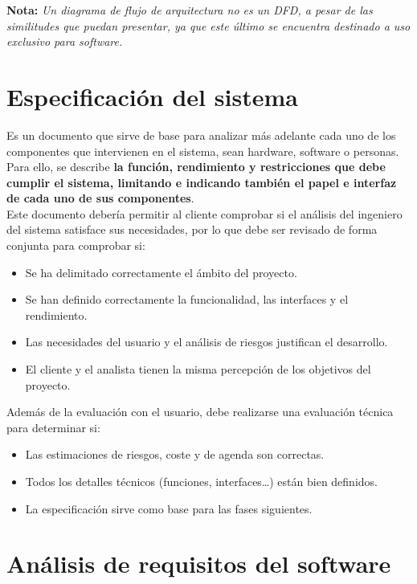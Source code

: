 \textbf{Nota:} \textit{Un diagrama de flujo de arquitectura no es un DFD, a pesar de las similitudes que puedan presentar, ya que este último se encuentra destinado a uso exclusivo para software.}

\section{Especificación del sistema}

Es un documento que sirve de base para analizar más adelante cada uno de los componentes que intervienen en el sistema, sean hardware, software o personas. Para ello, se describe \textbf{la función, rendimiento y restricciones que debe cumplir el sistema, limitando e indicando también el papel e interfaz de cada uno de sus componentes}.\\

Este documento debería permitir al cliente comprobar si el análisis del ingeniero del sistema satisface sus necesidades, por lo que debe ser revisado de forma conjunta para comprobar si:

\begin{itemize}
    \item Se ha delimitado correctamente el ámbito del proyecto.
    \item Se han definido correctamente la funcionalidad, las interfaces y el rendimiento.
    \item Las necesidades del usuario y el análisis de riesgos justifican el desarrollo.
    \item El cliente y el analista tienen la misma percepción de los objetivos del proyecto.
\end{itemize}

Además de la evaluación con el usuario, debe realizarse una evaluación técnica para determinar si:

\begin{itemize}
    \item Las estimaciones de riesgos, coste y de agenda son correctas.
    \item Todos los detalles técnicos (funciones, interfaces\ldots) están bien definidos.
    \item La especificación sirve como base para las fases siguientes.
\end{itemize}

\section{Análisis de requisitos del software}

